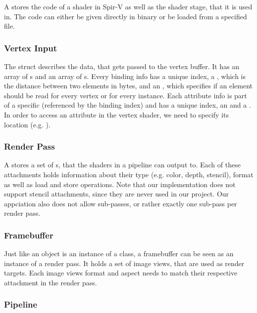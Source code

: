 A  stores the code of a shader in Spir-V as well as the shader stage, that it is used in. The code can either be given directly in binary or be loaded from a specified file.

\subsubsection{Vertex Input}

The  struct describes the data, that gets passed to the vertex buffer. It has an array of s and an array of s. Every binding info has a unique  index, a , which is the distance between two elements in bytes, and an , which specifies if an element should be read for every vertex or for every instance. Each attribute info is part of a specific  (referenced by the binding index) and has a unique  index, an  and a . In order to access an attribute in the vertex shader, we need to specify its location (e.g. ).

\subsubsection{Render Pass}

A  stores a set of s, that the shaders in a pipeline can output to. Each of these attachments holds information about their type (e.g. color, depth, stencil), format as well as load and store operations. Note that our implementation does not support stencil attachments, since they are never used in our project. Our appciation also does not allow sub-passes, or rather exactly one sub-pass per render pass.

\subsubsection{Framebuffer}

Just like an object is an instance of a class, a framebuffer can be seen as an instance of a render pass. It holds a set of image views, that are used as render targets. Each image views format and aspect needs to match their respective attachment in the render pass.

\subsubsection{Pipeline}


